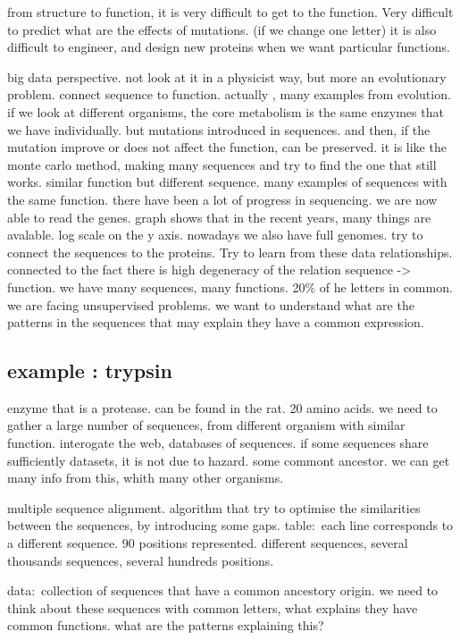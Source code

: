 from structure to function, it is very difficult to get to the function.
Very difficult to predict what are the effects of mutations. (if we change one
letter)
it is also difficult to engineer, and design new proteins when we want particular
functions.


big data perspective. not look at it in a physicist way, but more an evolutionary
problem. connect sequence to function. actually , many examples from evolution.
if we look at different organisms, the core metabolism is the same enzymes that we have individually. but mutations introduced in sequences. and then,
if the mutation improve or does not affect the function, can be preserved.
it is like the monte carlo method, making many sequences and try to find the one
that still works.
similar function but different sequence.
many examples of sequences with the same function.
there have been a lot of progress in sequencing. we are now able to read the genes.
graph shows that in the recent years, many things are avalable. log scale on the
y axis.
nowadays we also have full genomes.
try to connect the sequences to the proteins. Try to learn from these data
relationships.
connected to the fact there is high degeneracy of the relation sequence -> function.
we have many sequences, many functions. 20\% of he letters in common.
we are facing unsupervised problems.
we want to understand what are the patterns in the sequences that may explain they have a common expression.

\subsection{example : trypsin}

enzyme that is a protease.
can be found in the rat. 20 amino acids.
we need to gather a large number of sequences, from different organism with
similar function.
interogate the web, databases of sequences.
if some sequences share sufficiently datasets, it is not due to hazard. some
commont ancestor.
we can get many info from this, whith many  other organisms.

multiple sequence alignment.
algorithm that try to optimise the similarities between the sequences, by
introducing some gaps.
table: each line corresponds to a different sequence. 90 positions represented.
different sequences, several thousands sequences, several hundreds positions.

data: collection of sequences that have a common ancestory origin.
we need to think about these sequences with common letters, what explains they have common functions. what are the patterns explaining this?


